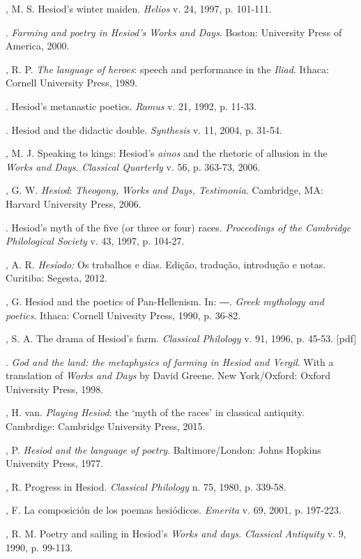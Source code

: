 \begin{bibliohedra}
, M. S. Hesiod's winter maiden. \emph{Helios} v. 24, 1997, p.
101-111.

\titidem. \emph{Farming and poetry in Hesiod's Works and Days}. Boston:
University Press of America, 2000.

, R. P. \emph{The language of heroes}: speech and performance in
the \emph{Iliad}. Ithaca: Cornell University Press, 1989.

\titidem. Hesiod's metanastic poetics. \emph{Ramus} v. 21, 1992, p. 11-33.

\titidem. Hesiod and the didactic double. \emph{Synthesis} v. 11, 2004, p.
31-54.

, M. J. Speaking to kings: Hesiod's \emph{ainos} and the rhetoric
of allusion in the \emph{Works and Days}. \emph{Classical Quarterly} v.
56, p. 363-73, 2006.

, G. W. \emph{Hesiod}: \emph{Theogony, Works and Days, Testimonia}.
Cambridge, MA: Harvard University Press, 2006.

\titidem. Hesiod's myth of the five (or three or four) races. \emph{Proceedings
of the Cambridge Philological Society} v. 43, 1997, p. 104-27.

, A. R. \emph{Hesíodo:} Os trabalhos e dias. Edição, tradução,
introdução e notas. Curitiba: Segesta, 2012.

, G. Hesiod and the poetics of Pan-Hellenism. In: ―. \emph{Greek
mythology and poetics}. Ithaca: Cornell Univesity Press, 1990, p. 36-82.

, S. A. The drama of Hesiod's farm. \emph{Classical Philology} v.
91, 1996, p. 45-53. {[}pdf{]}

\titidem. \emph{God and the land: the metaphysics of farming in Hesiod and
Vergil}. With a translation of \emph{Works and Days} by David Greene.
New York/Oxford: Oxford University Press, 1998.

, H. van. \emph{Playing Hesiod}: the `myth of the races' in
classical antiquity. Cambrdige: Cambridge University Press, 2015.

, P. \emph{Hesiod and the language of poetry}. Baltimore/London:
Johns Hopkins University Press, 1977.

, R. Progress in Hesiod. \emph{Classical Philology} n. 75, 1980,
p. 339-58.

, F. La composición de los poemas hesiódicos.
\emph{Emerita} v. 69, 2001, p. 197-223.

, R. M. Poetry and sailing in Hesiod's \emph{Works and days}.
\emph{Classical Antiquity} v. 9, 1990, p. 99-113.


\end{bibliohedra}
